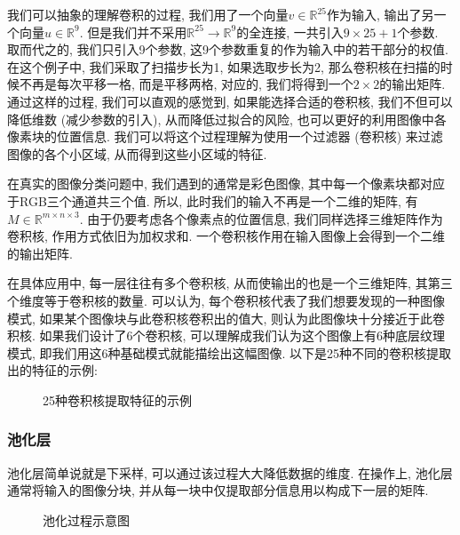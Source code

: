 \documentclass[lang=cn, 11pt,   a4paper]{elegantpaper}
\begin{document}
我们可以抽象的理解卷积的过程, 我们用了一个向量$v \in \mathbb{R}^{25}$作为输入, 输出了另一个向量$u \in \mathbb{R}^{9}$. 但是我们并不采用$\mathbb{R}^{25}\rightarrow \mathbb{R}^{9}$的全连接, 一共引入$9\times 25 +1$个参数. 取而代之的, 我们只引入9个参数, 这9个参数重复的作为输入中的若干部分的权值. 在这个例子中, 我们采取了扫描步长为1, 如果选取步长为2, 那么卷积核在扫描的时候不再是每次平移一格, 而是平移两格, 对应的, 我们将得到一个$2\times 2$的输出矩阵. 通过这样的过程, 我们可以直观的感觉到, 如果能选择合适的卷积核, 我们不但可以降低维数 (减少参数的引入), 从而降低过拟合的风险, 也可以更好的利用图像中各像素块的位置信息. 我们可以将这个过程理解为使用一个过滤器 (卷积核) 来过滤图像的各个小区域, 从而得到这些小区域的特征. 

在真实的图像分类问题中, 我们遇到的通常是彩色图像, 其中每一个像素块都对应于RGB三个通道共三个值. 所以, 此时我们的输入不再是一个二维的矩阵, 有$M \in \mathbb{R}^{m\times n\times 3}$. 由于仍要考虑各个像素点的位置信息, 我们同样选择三维矩阵作为卷积核, 作用方式依旧为加权求和. 一个卷积核作用在输入图像上会得到一个二维的输出矩阵.

在具体应用中, 每一层往往有多个卷积核, 从而使输出的也是一个三维矩阵, 其第三个维度等于卷积核的数量. 可以认为, 每个卷积核代表了我们想要发现的一种图像模式, 如果某个图像块与此卷积核卷积出的值大, 则认为此图像块十分接近于此卷积核. 如果我们设计了6个卷积核, 可以理解成我们认为这个图像上有6种底层纹理模式, 即我们用这6种基础模式就能描绘出这幅图像. 以下是25种不同的卷积核提取出的特征的示例: 
\begin{figure}[H]
\caption{25种卷积核提取特征的示例}
\end{figure}

\subsubsection{池化层}
池化层简单说就是下采样, 可以通过该过程大大降低数据的维度. 在操作上, 池化层通常将输入的图像分块, 并从每一块中仅提取部分信息用以构成下一层的矩阵.
\begin{figure}[h]
\caption{池化过程示意图}
\end{figure}
\end{document}

